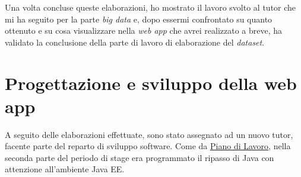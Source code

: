 Una volta concluse queste elaborazioni, ho mostrato il lavoro svolto al tutor che mi ha seguito per la parte \textit{big data} e, dopo essermi confrontato su quanto ottenuto e su cosa visualizzare nella \textit{web app} che avrei realizzato a breve, ha validato la conclusione della parte di lavoro di elaborazione del \textit{dataset}.


\section{Progettazione e sviluppo della web app}
A seguito delle elaborazioni effettuate, sono stato assegnato ad un nuovo tutor, facente parte del reparto di sviluppo software. Come da \hyperref[pdl]{Piano di Lavoro}, nella seconda parte del periodo di stage era programmato il ripasso di Java con attenzione all'ambiente Java EE. 